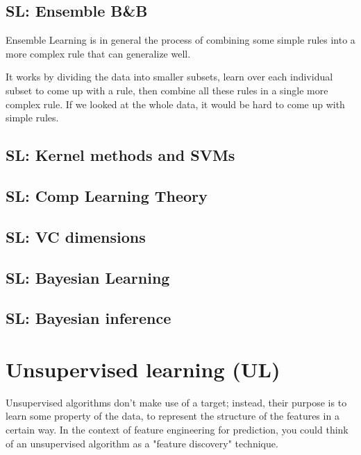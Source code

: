 \documentclass[12pt]{report}
\begin{document}
\section{SL: Ensemble B\&B}

Ensemble Learning is in general the process of combining some simple rules into a more complex rule that can generalize well.

It works by dividing the data into smaller subsets, learn over each individual subset to come up with a rule, then combine all these rules in a single more complex rule. If we looked at the whole data, it would be hard to come up with simple rules.




\section{SL: Kernel methods and SVMs}
\section{SL: Comp Learning Theory}
\section{SL: VC dimensions}
\section{SL: Bayesian Learning}
\section{SL: Bayesian inference}


\chapter[Unsupervised learning]{Unsupervised learning (UL)}

Unsupervised algorithms don't make use of a target; instead, their purpose is to learn some property of the data, to represent the structure of the features in a certain way. In the context of feature engineering for prediction, you could think of an unsupervised algorithm as a "feature discovery" technique.
\end{document}
